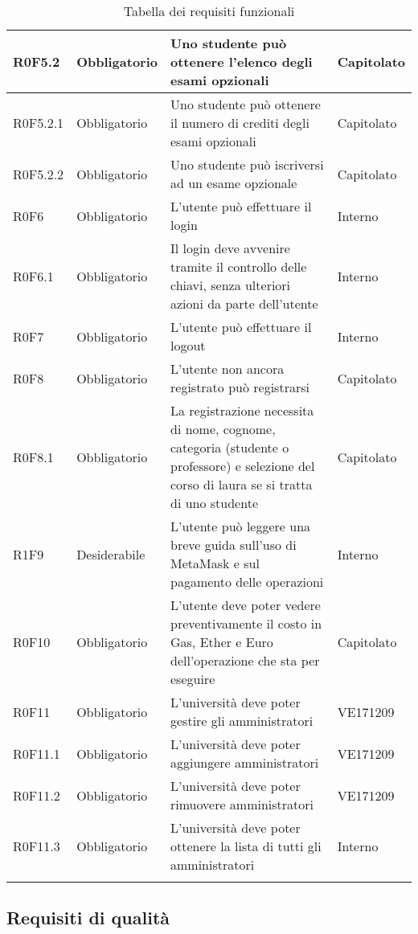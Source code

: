 \documentclass[AnalisiDeiRequisiti.tex]{subfiles}
\begin{document}
\begin{longtable}[H]{|p{2.5cm}|p{2.5cm}|p{5cm}|p{2cm}|}
	R0F5.2 & Obbligatorio & Uno studente può ottenere l'elenco degli esami opzionali & Capitolato \\ \hline
	R0F5.2.1 & Obbligatorio & Uno studente può ottenere il numero di crediti degli esami opzionali & Capitolato \\ \hline
	R0F5.2.2 & Obbligatorio & Uno studente può iscriversi ad un esame opzionale & Capitolato \\ \hline
	R0F6 & Obbligatorio & L'utente può effettuare il login & Interno \\ \hline
	R0F6.1 & Obbligatorio & Il login deve avvenire tramite il controllo delle chiavi, senza ulteriori azioni da parte dell'utente & Interno \\ \hline
	R0F7 & Obbligatorio & L'utente può effettuare il logout & Interno \\ \hline
	R0F8 & Obbligatorio & L'utente non ancora registrato può registrarsi & Capitolato \\ \hline
	R0F8.1 & Obbligatorio & La registrazione necessita di nome, cognome, categoria (studente o professore) e selezione del corso di laura se si tratta di uno studente & Capitolato \\ \hline
	R1F9 & Desiderabile & L'utente può leggere una breve guida sull'uso di MetaMask e sul pagamento delle operazioni & Interno \\ \hline	
	R0F10 & Obbligatorio & L'utente deve poter vedere preventivamente il costo in Gas, Ether e Euro dell'operazione che sta per eseguire & Capitolato \\ \hline	
	R0F11 & Obbligatorio & L'università deve poter gestire gli amministratori & VE171209 \\ \hline %
	R0F11.1 & Obbligatorio & L'università deve poter aggiungere amministratori & VE171209 \\ \hline %
	R0F11.2 & Obbligatorio & L'università deve poter rimuovere amministratori & VE171209 \\ \hline %
	R0F11.3 & Obbligatorio & L'università deve poter ottenere la lista di tutti gli amministratori & Interno \\ \hline 
	\caption{Tabella dei requisiti funzionali}
\end{longtable}

\subsection{Requisiti di qualità}
\end{document}
